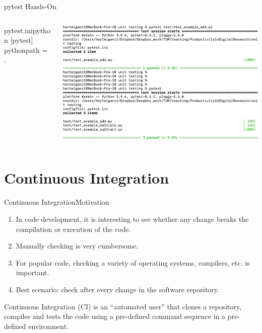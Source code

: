 \documentclass{setbeamer}
\begin{document}
\begin{frame}[fragile]{pytest Hands-On}
    \begin{columns}
        \begin{column}{0.2\textwidth}
            \begin{TUMCodeBlock}{pytest.ini}{python}
[pytest]
pythonpath = .
            \end{TUMCodeBlock}
        \end{column}
        \begin{column}{0.6\textwidth}
        \vspace{1cm}
            \includegraphics[width=\columnwidth]{resources/pytestmath}
        \end{column}
    \end{columns}


\end{frame}




\section{Continuous Integration}

\begin{frame}{Continuous Integration}{Motivation}
    \begin{enumerate}
        \item In code development, it is interesting to see whether any change breaks the compilation or execution of the code.
        \item Manually checking is very cumbersome.
        \item For popular code, checking a variety of operating systems, compilers, etc. is important.
        \item Best scenario: check after every change in the software repository.
    \end{enumerate}

\vspace{1cm}

Continuous Integration (CI) is an ``automated user'' that clones a repository, compiles and tests the code using a pre-defined command sequence in a pre-defined environment.   
    
\end{frame}
\end{document}
